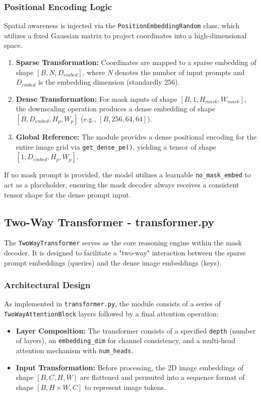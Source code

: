 \subsubsection{Positional Encoding Logic}
Spatial awareness is injected via the \texttt{PositionEmbeddingRandom} class, which utilizes a fixed Gaussian matrix to project coordinates into a high-dimensional space.
\begin{enumerate}
	\item \textbf{Sparse Transformation:} Coordinates are mapped to a sparse embedding of shape $[B, N, D_{embed}]$, where $N$ denotes the number of input prompts and $D_{embed}$ is the embedding dimension (standardly 256).
	\item \textbf{Dense Transformation:} For mask inputs of shape $[B, 1, H_{mask}, W_{mask}]$, the downscaling operation produces a dense embedding of shape $[B, D_{embed}, H_{p}, W_{p}]$ (e.g., $[B, 256, 64, 64]$).
	\item \textbf{Global Reference:} The module provides a dense positional encoding for the entire image grid via \texttt{get\_dense\_pe()}, yielding a tensor of shape $[1, D_{embed}, H_{p}, W_{p}]$.
\end{enumerate}

If no mask prompt is provided, the model utilizes a learnable \texttt{no\_mask\_embed} to act as a placeholder, ensuring the mask decoder always receives a consistent tensor shape for the dense prompt input.

\subsection{Two-Way Transformer - transformer.py}
The \texttt{TwoWayTransformer} serves as the core reasoning engine within the mask decoder. It is designed to facilitate a "two-way" interaction between the sparse prompt embeddings (queries) and the dense image embeddings (keys).

\subsubsection{Architectural Design}
As implemented in \texttt{transformer.py}, the module consists of a series of \texttt{TwoWayAttentionBlock} layers followed by a final attention operation:

\begin{itemize}
	\item \textbf{Layer Composition:} The transformer consists of a specified \texttt{depth} (number of layers), an \texttt{embedding\_dim} for channel consistency, and a multi-head attention mechanism with \texttt{num\_heads}.
	
	\item \textbf{Input Transformation:} Before processing, the 2D image embeddings of shape $[B, C, H, W]$ are flattened and permuted into a sequence format of shape $[B, H \times W, C]$ to represent image tokens.
\end{itemize}

